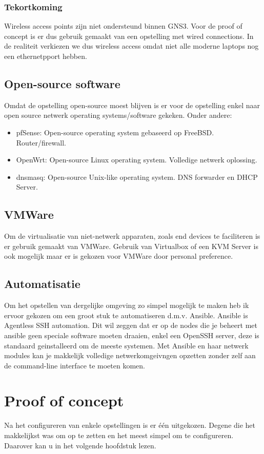 \subsubsection{Tekortkoming}
Wireless access points zijn niet ondersteund binnen GNS3. Voor de proof of concept is er dus gebruik gemaakt van een opstelling met wired connections. In de realiteit verkiezen we dus wireless access omdat niet alle moderne laptops nog een ethernetpport hebben.   

\subsection{Open-source software}
Omdat de opstelling open-source moest blijven is er voor de opstelling enkel naar open source netwerk operating systems/software gekeken. Onder andere:
\begin{itemize}	
	\item pfSense: Open-source operating system gebaseerd op FreeBSD. Router/firewall.
	\item OpenWrt: Open-source Linux operating system. Volledige netwerk oplossing. 
	\item dnsmasq: Open-source Unix-like operating system. DNS forwarder en DHCP Server.
\end{itemize}

\subsection{VMWare}
Om de virtualisatie van niet-netwerk apparaten, zoals end devices te faciliteren is er gebruik gemaakt van VMWare. Gebruik van Virtualbox of een KVM Server is ook mogelijk maar er is gekozen voor VMWare door personal preference. 

\subsection{Automatisatie}

Om het opstellen van dergelijke omgeving zo simpel mogelijk te maken heb ik ervoor gekozen om een groot stuk te automatiseren d.m.v. Ansible. Ansible is Agentless SSH automation. Dit wil zeggen dat er op de nodes die je beheert met ansible geen speciale software moeten draaien, enkel een OpenSSH server, deze is standaard geinstalleerd om de meeste systemen. Met Ansible en haar netwerk modules kan je makkelijk volledige netwerkomgeivngen opzetten zonder zelf aan de command-line interface te moeten komen. 

\section{Proof of concept}
Na het configureren van enkele opstellingen is er \'{e}\'{e}n uitgekozen. Degene die het makkelijkst was om op te zetten en het meest simpel om te  configureren. Daarover kan u in het volgende hoofdstuk lezen.
